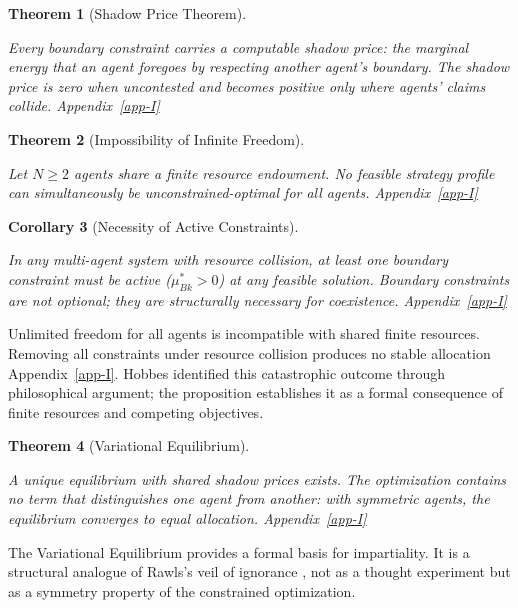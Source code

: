\documentclass[11pt]{article}
\theoremstyle{plain}
\newtheorem{theorem}{Theorem}
\newtheorem{corollary}[theorem]{Corollary}
\theoremstyle{definition}
\theoremstyle{remark}
\begin{document}
\begin{theorem}[Shadow Price Theorem]
\label{ethics-thm-shadow-price}

Every boundary constraint carries a computable shadow price: the marginal energy that an agent foregoes by respecting another agent's boundary. The shadow price is zero when uncontested and becomes positive only where agents' claims collide. Appendix~\ref{app-I}
\end{theorem}

\begin{theorem}[Impossibility of Infinite Freedom]
\label{ethics-thm-inf-freedom}

Let $N \geq 2$ agents share a finite resource endowment. No feasible strategy profile can simultaneously be unconstrained-optimal for all agents. Appendix~\ref{app-I}
\end{theorem}

\begin{corollary}[Necessity of Active Constraints]
\label{ethics-cor-active-constraints}

In any multi-agent system with resource collision, at least one boundary constraint must be active ($\mu_{Bk}^* > 0$) at any feasible solution. Boundary constraints are not optional; they are structurally necessary for coexistence. Appendix~\ref{app-I}
\end{corollary}

Unlimited freedom for all agents is incompatible with shared finite
resources. Removing all constraints under resource collision produces no
stable allocation Appendix~\ref{app-I}. Hobbes \citep{Hobbes1651}
identified this catastrophic outcome through philosophical argument; the
proposition establishes it as a formal consequence of finite resources
and competing objectives.

\begin{theorem}[Variational Equilibrium]
\label{ethics-thm-variational-eq}

A unique equilibrium with shared shadow prices exists. The optimization contains no term that distinguishes one agent from another: with symmetric agents, the equilibrium converges to equal allocation. Appendix~\ref{app-I}
\end{theorem}

The Variational Equilibrium provides a formal basis for impartiality. It
is a structural analogue of Rawls's veil of ignorance \citep{Rawls1971},
not as a thought experiment but as a symmetry property of the
constrained optimization.
\end{document}
